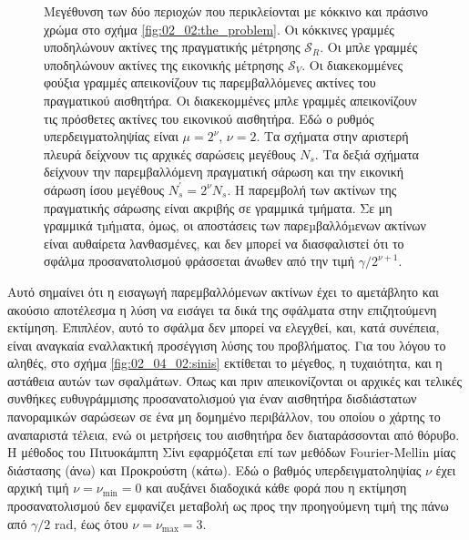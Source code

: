 \begin{figure}[h]\centering
  \vspace{0.5cm}
  
  \vspace{1.0cm}
  \caption{\small Μεγέθυνση των δύο περιοχών που περικλείονται με κόκκινο
           και πράσινο χρώμα στο σχήμα \ref{fig:02_02:the_problem}. Οι κόκκινες
           γραμμές υποδηλώνουν ακτίνες της πραγματικής μέτρησης $\mathcal{S}_R$.
           Oι μπλε γραμμές υποδηλώνουν ακτίνες της εικονικής μέτρησης $\mathcal{S}_V$.
           Οι διακεκομμένες φούξια γραμμές απεικονίζουν τις παρεμβαλλόμενες
           ακτίνες του πραγματικού αισθητήρα. Οι διακεκομμένες μπλε γραμμές
           απεικονίζουν τις πρόσθετες ακτίνες του εικονικού αισθητήρα.
           Εδώ ο ρυθμός υπερδειγματοληψίας είναι $\mu = 2^\nu$, $\nu = 2$.
           Τα σχήματα στην αριστερή πλευρά δείχνουν τις αρχικές σαρώσεις
           μεγέθους $N_s$. Τα δεξιά σχήματα δείχνουν την παρεμβαλλόμενη
           πραγματική σάρωση και την εικονική σάρωση ίσου μεγέθους $N_s^\prime
           = 2^\nu N_s$. Η παρεμβολή των ακτίνων της πραγματικής σάρωσης είναι
           ακριβής σε γραμμικά τμήματα. Σε μη γραμμικά τµήµατα, όμως, οι
           αποστάσεις των παρεµβαλλόµενων ακτίνων είναι αυθαίρετα λανθασμένες,
           και δεν μπορεί να διασφαλιστεί ότι το σφάλμα προσανατολισμού
           φράσσεται άνωθεν από την τιμή $\gamma/2^{\nu+1}$. }
  \label{fig:oversampling_goes_wrong}
\end{figure}

Αυτό σημαίνει ότι η εισαγωγή παρεμβαλλόμενων ακτίνων έχει το αμετάβλητο και
ακούσιο αποτέλεσμα η λύση να εισάγει τα δικά της σφάλματα στην επιζητούμενη
εκτίμηση. Επιπλέον, αυτό το σφάλμα δεν μπορεί να ελεγχθεί, και, κατά συνέπεια,
είναι αναγκαία εναλλακτική προσέγγιση λύσης του προβλήματος. Για του λόγου το
αληθές, στο σχήμα \ref{fig:02_04_02:sinis} εκτίθεται το μέγεθος, η τυχαιότητα,
και η αστάθεια αυτών των σφαλμάτων. Όπως και πριν απεικονίζονται οι αρχικές και
τελικές συνθήκες ευθυγράμμισης προσανατολισμού για έναν αισθητήρα δισδιάστατων
πανοραμικών σαρώσεων σε ένα μη δομημένο περιβάλλον, του οποίου ο χάρτης το
αναπαριστά τέλεια, ενώ οι μετρήσεις του αισθητήρα δεν διαταράσσονται από
θόρυβο. H μέθοδος του Πιτυοκάμπτη Σίνι εφαρμόζεται επί των μεθόδων
Fourier-Mellin μίας διάστασης (άνω) και Προκρούστη (κάτω). Εδώ ο βαθμός
υπερδειγματοληψίας $\nu$ έχει αρχική τιμή $\nu = \nu_{\min} = 0$ και αυξάνει
διαδοχικά κάθε φορά που η εκτίμηση προσανατολισμού δεν εμφανίζει μεταβολή ως
προς την προηγούμενη τιμή της πάνω από $\gamma/2$ rad, έως ότου
$\nu = \nu_{\max} = 3$.

